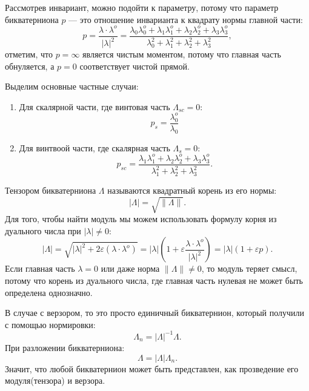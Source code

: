 Рассмотрев инвариант, можно подойти к параметру, потому что параметр бикватерниона $p$ --- это отношение инварианта к квадрату нормы главной части:
\begin{equation*}
    p = \frac{\lambda \cdot \lambda^o}{|\lambda|^2} = \frac{\lambda_0 \lambda_0^o + \lambda_1 \lambda_1^o + \lambda_2 \lambda_2^o + \lambda_3 \lambda_3^o}{\lambda_0^2 + \lambda_1^2 + \lambda_2^2 + \lambda_3^2},
\end{equation*}
отметим, что $p = \infty$ является чистым моментом, потому что главная часть обнуляется, а $p = 0$ соответствует чистой прямой.

Выделим основные частные случаи:
\begin{enumerate}
    \item Для скалярной части, где винтовая часть $\Lambda_{sc} = 0$:
        \begin{equation*}
            p_s = \frac{\lambda_0^o}{\lambda_0}
        \end{equation*}
    \item Для винтвоой части, где скалярная часть $\Lambda_s = 0$:
        \begin{equation*}
            p_{sc} = \frac{\lambda_1 \lambda_1^o + \lambda_2 \lambda_2^o + \lambda_3 \lambda_3^o}{\lambda_1^2 + \lambda_2^2 + \lambda_3^2}.
        \end{equation*}
\end{enumerate}

Тензором бикватерниона $\Lambda$ называются квадратный корень из его нормы:
\begin{equation*}
    |\Lambda| = \sqrt{\|\Lambda\|}.
\end{equation*}
Для того, чтобы найти модуль мы можем использовать формулу корня из дуального числа при $|\lambda| \neq 0$:
\begin{equation*}
    |\Lambda| = \sqrt{|\lambda|^2 + 2\varepsilon (\lambda \cdot \lambda^o)} = |\lambda| \left(1 + \varepsilon \frac{\lambda \cdot \lambda^o}{|\lambda|^2}\right) = |\lambda| (1 + \varepsilon p).
\end{equation*}
Если главная часть $\lambda = 0$ или даже норма $\|\Lambda\| \neq 0$, то модуль теряет смысл, потому что корень из дуального числа, где главная часть нулевая не может быть определена однозначно.

В случае с верзором, то это просто единичный бикватернион, который получили с помощью нормировки:
\begin{equation*}
    \Lambda_n = |\Lambda|^{-1} \Lambda.
\end{equation*}
При разложении бикватерниона:
\begin{equation*}
    \Lambda = |\Lambda| \Lambda_n.
\end{equation*}
Значит, что любой бикватернион может быть представлен, как прозведение его модуля(тензора) и верзора.

